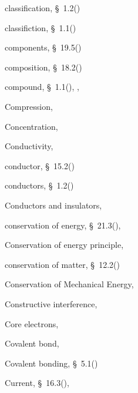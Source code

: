 \begin{multicols}{2}
{\begin{description}
	  \item[] \noindent\raggedright classification,  \S~1.2(\pageref{m38706})
	  \item[] \noindent\raggedright classifiction,  \S~1.1(\pageref{m38708})
	  \item[] \noindent\raggedright components,  \S~19.5(\pageref{m38819})
	  \item[] \noindent\raggedright composition,  \S~18.2(\pageref{m38712})
	  \item[] \noindent\raggedright compound,  \S~1.1(\pageref{m38708}),  \pageref{id2406453},  \pageref{id2456442}
	  \item[] \noindent\raggedright Compression,  \pageref{id2399629}
	  \item[] \noindent\raggedright Concentration,  \pageref{id2504991}
	  \item[] \noindent\raggedright Conductivity,  \pageref{id2491504}
	  \item[] \noindent\raggedright conductor,  \S~15.2(\pageref{m38781})
	  \item[] \noindent\raggedright conductors,  \S~1.2(\pageref{m38706})
	  \item[] \noindent\raggedright Conductors and insulators,  \pageref{id2409398}
	  \item[] \noindent\raggedright conservation of energy,  \S~21.3(\pageref{m38786}),  \pageref{id2556212}
	  \item[] \noindent\raggedright Conservation of energy principle,  \pageref{id2460317}
	  \item[] \noindent\raggedright conservation of matter,  \S~12.2(\pageref{m38711})
	  \item[] \noindent\raggedright Conservation of Mechanical Energy,  \pageref{id2556268}
	  \item[] \noindent\raggedright Constructive interference,  \pageref{id2436281}
	  \item[] \noindent\raggedright Core electrons,  \pageref{id2421542}
	  \item[] \noindent\raggedright Covalent bond,  \pageref{id2427171}
	  \item[] \noindent\raggedright Covalent bonding,  \S~5.1(\pageref{m38704})
	  \item[] \noindent\raggedright Current,  \S~16.3(\pageref{m38773}),  \pageref{id2483239}

\end{description}}
\end{multicols}
